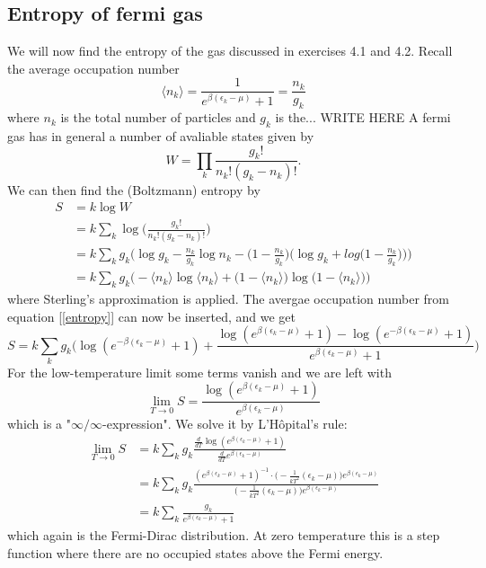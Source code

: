 \documentclass[norsk,a4paper,12pt]{article}
\begin{document}
\subsection{Entropy of fermi gas}
We will now find the entropy of the gas discussed in exercises 4.1 and 4.2. Recall the average occupation number
\begin{equation}
\langle n_k\rangle = \frac{1}{e^{\beta(\epsilon_k-\mu)}+1}=\frac{n_k}{g_k}
\label{entropy}
\end{equation}
where $n_k$ is the total number of particles and $g_k$ is the... WRITE HERE
A fermi gas has in general a number of avaliable states given by
\begin{equation}
W=\prod_k\frac{g_k!}{n_k!(g_k-n_k)!}.
\end{equation}
We can then find the (Boltzmann) entropy by
\begin{align}
S&=k\log W\\
&=k\sum_k\log\bigg(\frac{g_k!}{n_k!(g_k-n_k)!}\bigg)\\
&=k\sum_kg_k\bigg(\log g_k-\frac{n_k}{g_k}\log n_k-\Big(1-\frac{n_k}{g_k}\Big)\Big(\log g_k + log\big(1-\frac{n_k}{g_k}\big)\Big)\bigg)\\
&=k\sum_kg_k\Big(-\langle n_k\rangle\log\langle n_k\rangle+\big(1-\langle n_k\rangle\big)\log\big(1-\langle n_k\rangle\big)\Big)
\end{align}
where Sterling's approximation is applied. The avergae occupation number from equation [\ref{entropy}] can now be inserted, and we get
\begin{equation*}
S=k\sum_kg_k\bigg(\log(e^{-\beta(\epsilon_k-\mu)}+1)+\frac{\log(e^{\beta(\epsilon_k-\mu)}+1)-\log(e^{-\beta(\epsilon_k-\mu)}+1)}{e^{\beta(\epsilon_k -\mu)}+1}\bigg)
\end{equation*}
For the low-temperature limit some terms vanish and we are left with
\begin{equation}
\lim_{T\rightarrow 0}S=\frac{\log(e^{\beta(\epsilon_k-\mu)}+1)}{e^{\beta(\epsilon_k -\mu)}}
\end{equation}
which is a "$\infty/\infty$-expression". We solve it by L'Hôpital's rule:
\begin{align}
\lim_{T\rightarrow 0}S&=k\sum_kg_k\frac{\frac{d}{dT}\log(e^{\beta(\epsilon_k-\mu)}+1)}{\frac{d}{dT}e^{\beta(\epsilon_k -\mu)}}\\
&=k\sum_kg_k\frac{(e^{\beta(\epsilon_k-\mu)}+1)^{-1}\cdot\big(-\frac{1}{kT^2}(\epsilon_k-\mu)\big)e^{\beta(\epsilon_k-\mu)}}{\big(-\frac{1}{kT^2}(\epsilon_k-\mu)\big)e^{\beta(\epsilon_k-\mu)}}\\
&=k\sum_k\frac{g_k}{e^{\beta(\epsilon_k-\mu)}+1}
\end{align}
which again is the Fermi-Dirac distribution. At zero temperature this is a step function where there are no occupied states above the Fermi energy. 
\end{document}
